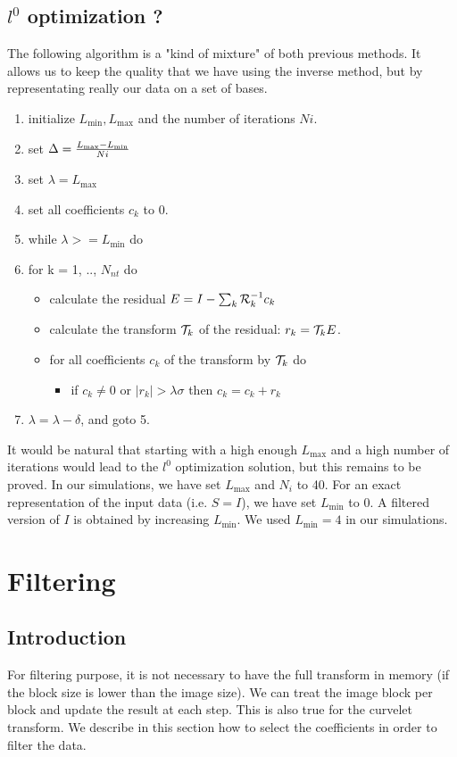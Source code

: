 \documentclass[11pt,a4paper]{article}
\begin{document}
\subsection{$l^0$ optimization ?}
The following algorithm is a "kind of mixture" of both previous methods.
It allows us to keep the quality that we have using the inverse method,
but by representating really our data on a set of bases.
\begin{enumerate}
\item initialize $ L_{\min}, L_{\max}$ and the number of iterations $Ni$.
\item set $\Delta = {L_{\max} - L_{\min} \over Ni}$
\item set $\lambda = L_{\max}$
\item set all coefficients $c_k$ to 0.
\item while $\lambda >= L_{\min}$ do
\item for k = 1, .., $N_{nt}$ do
\begin{itemize}
\item calculate the residual $E = I - \sum_k {\cal R}_k^{-1} c_k$
\item calculate the transform ${\cal T}_k$ of the residual:
$r_k = {\cal T}_k E$.
\item for all coefficients $c_k$ of the transform by ${\cal T}_k$ do
\begin{itemize}
\item if $c_k \ne 0$ or $\mid r_k \mid > \lambda \sigma$ then $c_k = c_k + r_k$
\end{itemize}
\end{itemize}
\item $\lambda = \lambda - \delta$, and goto 5.
\end{enumerate}
It would be natural that starting with a high enough $L_{\max}$  and a high
number of iterations would lead to the $l^0$ optimization solution,
but this remains to be proved.  
In our simulations, we have set $L_{\max}$ and $N_i$ to 40. For an exact
representation of the input data (i.e. $S=I$), we have  set 
  $ L_{\min} $ to 0. A filtered version of $I$ is obtained by increasing
$ L_{\min} $. We used $ L_{\min} = 4 $ in our simulations.

\section{Filtering}
\subsection{Introduction}
For filtering purpose, it is not necessary to have the full transform
in memory (if the block size is lower than the image size). We can
treat the image block per block and update the result at each step.
This is also true for the curvelet transform. We describe in this section
how to select the coefficients in order to filter the data.
\end{document}
